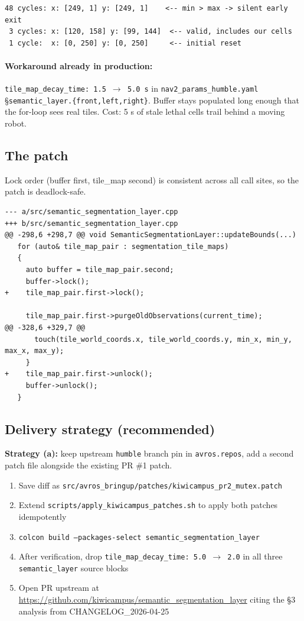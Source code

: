 \documentclass[11pt]{article}
\begin{document}
\begin{lstlisting}
48 cycles: x: [249, 1] y: [249, 1]    <-- min > max -> silent early exit
 3 cycles: x: [120, 158] y: [99, 144]  <-- valid, includes our cells
 1 cycle:  x: [0, 250] y: [0, 250]     <-- initial reset
\end{lstlisting}

\paragraph{Workaround already in production:}
\texttt{tile\_map\_decay\_time: 1.5 $\to$ 5.0\,s} in
\texttt{nav2\_params\_humble.yaml} \S\texttt{semantic\_layer.\{front,left,right\}}.
Buffer stays populated long enough that the for-loop sees real tiles. Cost:
5 s of stale lethal cells trail behind a moving robot.

\subsection{The patch}

Lock order (buffer first, tile\_map second) is consistent across all call
sites, so the patch is deadlock-safe.

\begin{lstlisting}
--- a/src/semantic_segmentation_layer.cpp
+++ b/src/semantic_segmentation_layer.cpp
@@ -298,6 +298,7 @@ void SemanticSegmentationLayer::updateBounds(...)
   for (auto& tile_map_pair : segmentation_tile_maps)
   {
     auto buffer = tile_map_pair.second;
     buffer->lock();
+    tile_map_pair.first->lock();

     tile_map_pair.first->purgeOldObservations(current_time);
@@ -328,6 +329,7 @@
       touch(tile_world_coords.x, tile_world_coords.y, min_x, min_y, max_x, max_y);
     }
+    tile_map_pair.first->unlock();
     buffer->unlock();
   }
\end{lstlisting}

\subsection{Delivery strategy (recommended)}

\textbf{Strategy (a):} keep upstream \texttt{humble} branch pin in
\texttt{avros.repos}, add a second patch file alongside the existing PR \#1
patch.

\begin{enumerate}[leftmargin=2em,nosep]
\item Save diff as \texttt{src/avros\_bringup/patches/kiwicampus\_pr2\_mutex.patch}
\item Extend \texttt{scripts/apply\_kiwicampus\_patches.sh} to apply both
  patches idempotently
\item \texttt{colcon build --packages-select semantic\_segmentation\_layer}
\item After verification, drop \texttt{tile\_map\_decay\_time: 5.0 $\to$ 2.0} in
  all three \texttt{semantic\_layer} source blocks
\item Open PR upstream at
  \url{https://github.com/kiwicampus/semantic_segmentation_layer} citing the
  \S 3 analysis from CHANGELOG\_2026-04-25
\end{enumerate}
\end{document}
